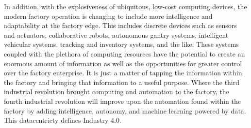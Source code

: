 In addition, with the explosiveness of ubiquitous, low-cost computing devices, the modern factory operation is changing to include more intelligence and adaptability at the factory edge.  This includes discrete devices such as sensors and actuators, collaborative robots, autonomous gantry systems, intelligent vehicular systems, tracking and inventory systems, and the like.  These systems coupled with the plethora of computing resources have the potential to create an enormous amount of information as well as the opportunities for greater control over the factory enterprise.  It is just a matter of tapping the information within the factory and bringing that information to a useful purpose.  Where the third industrial revolution brought computing and automation to the factory, the fourth industrial revolution will improve upon the automation found within the factory by adding intelligence, autonomy, and machine learning powered by data. This datacentricty defines Industry 4.0.  

